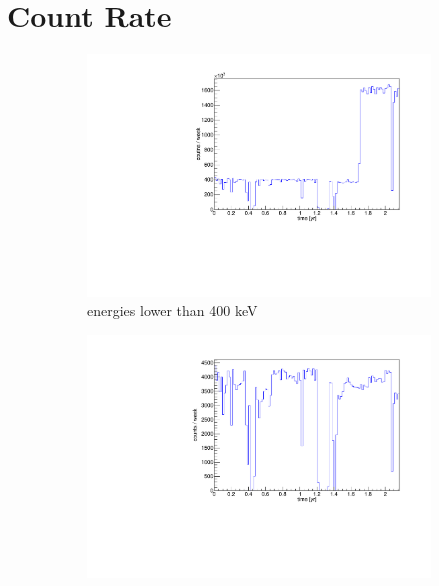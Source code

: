\\



\section{Count Rate}
\label{sec:EventAct}

\begin{figure}[t!]
	\centering
	\begin{subfigure}{.475\textwidth}
		\centering
		\includegraphics[width=\textwidth]{./Bilder/ZeitverlaufALLE.pdf}
		\caption{energies lower than 400 keV}
		\label{fig:ZeitAll}
	\end{subfigure}\hfill%
	\begin{subfigure}{.475\textwidth}
		\centering
		\includegraphics[width=\textwidth]{./Bilder/ZeitverlaufLimits.pdf}

\end{subfigure}
\end{figure}

